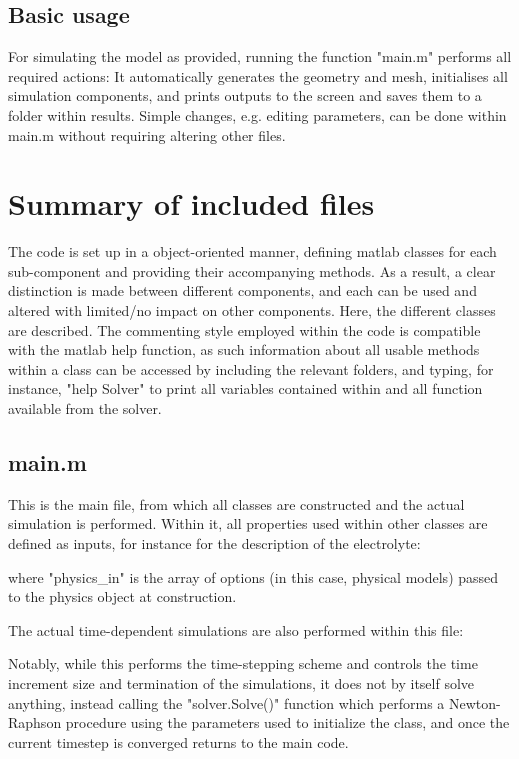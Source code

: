 \documentclass[3p]{elsarticle} %
\begin{document}
\subsection{Basic usage}
For simulating the model as provided, running the function "main.m" performs all required actions: It automatically generates the geometry and mesh, initialises all simulation components, and prints outputs to the screen and saves them to a folder within results. Simple changes, e.g. editing parameters, can be done within main.m without requiring altering other files. 

\section{Summary of included files}
The code is set up in a object-oriented manner, defining matlab classes for each sub-component and providing their accompanying methods. As a result, a clear distinction is made between different components, and each can be used and altered with limited/no impact on other components. Here, the different classes are described. The commenting style employed within the code is compatible with the matlab help function, as such information about all usable methods within a class can be accessed by including the relevant folders, and typing, for instance, "help Solver" to print all variables contained within and all function available from the solver. 

\subsection{main.m}
This is the main file, from which all classes are constructed and the actual simulation is performed. Within it, all properties used within other classes are defined as inputs, for instance for the description of the electrolyte:

where "physics{\_}in" is the array of options (in this case, physical models) passed to the physics object at construction. 

The actual time-dependent simulations are also performed within this file:


Notably, while this performs the time-stepping scheme and controls the time increment size and termination of the simulations, it does not by itself solve anything, instead calling the "solver.Solve()" function which performs a Newton-Raphson procedure using the parameters used to initialize the class, and once the current timestep is converged returns to the main code.
\end{document}
